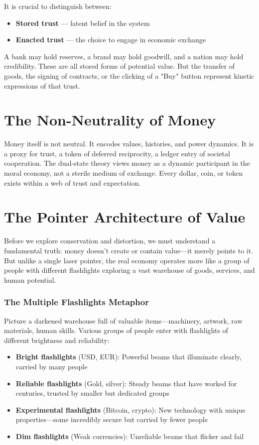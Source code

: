 \documentclass[11pt,oneside]{book}
\begin{document}
It is crucial to distinguish between:
\begin{itemize}
\item \textbf{Stored trust} — latent belief in the system
\item \textbf{Enacted trust} — the choice to engage in economic exchange
\end{itemize}

A bank may hold reserves, a brand may hold goodwill, and a nation may hold credibility. These are all stored forms of potential value. But the transfer of goods, the signing of contracts, or the clicking of a "Buy" button represent kinetic expressions of that trust.

\section{The Non-Neutrality of Money}

Money itself is not neutral. It encodes values, histories, and power dynamics. It is a proxy for trust, a token of deferred reciprocity, a ledger entry of societal cooperation. The dual-state theory views money as a dynamic participant in the moral economy, not a sterile medium of exchange. Every dollar, coin, or token exists within a web of trust and expectation.

\section{The Pointer Architecture of Value}

Before we explore conservation and distortion, we must understand a fundamental truth: money doesn't create or contain value—it merely points to it. But unlike a single laser pointer, the real economy operates more like a group of people with different flashlights exploring a vast warehouse of goods, services, and human potential.

\subsubsection{The Multiple Flashlights Metaphor}

Picture a darkened warehouse full of valuable items—machinery, artwork, raw materials, human skills. Various groups of people enter with flashlights of different brightness and reliability:

\begin{itemize}
\item \textbf{Bright flashlights} (USD, EUR): Powerful beams that illuminate clearly, carried by many people
\item \textbf{Reliable flashlights} (Gold, silver): Steady beams that have worked for centuries, trusted by smaller but dedicated groups
\item \textbf{Experimental flashlights} (Bitcoin, crypto): New technology with unique properties—some incredibly secure but carried by fewer people
\item \textbf{Dim flashlights} (Weak currencies): Unreliable beams that flicker and fail
\end{itemize}
\end{document}
